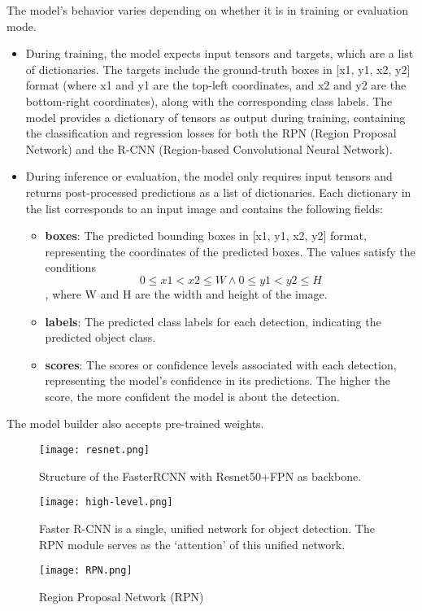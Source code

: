 The model's behavior varies depending on whether it is in training or evaluation mode.
\begin{itemize}
    \item During training, the model expects input tensors and targets, which are a list of dictionaries. The targets include the ground-truth boxes in [x1, y1, x2, y2] format (where x1 and y1 are the top-left coordinates, and x2 and y2 are the bottom-right coordinates), along with the corresponding class labels. The model provides a dictionary of tensors as output during training, containing the classification and regression losses for both the RPN (Region Proposal Network) and the R-CNN (Region-based Convolutional Neural Network).
    \item During inference or evaluation, the model only requires input tensors and returns post-processed predictions as a list of dictionaries. Each dictionary in the list corresponds to an input image and contains the following fields:
    \begin{itemize}
        \item \textbf{boxes}: The predicted bounding boxes in [x1, y1, x2, y2] format, representing the coordinates of the predicted boxes. The values satisfy the conditions \[0 \le x1 < x2 \le W \land 0 \le y1 < y2 \le H\], where W and H are the width and height of the image.
        \item \textbf{labels}: The predicted class labels for each detection, indicating the predicted object class.
        \item \textbf{scores}: The scores or confidence levels associated with each detection, representing the model's confidence in its predictions. The higher the score, the more confident the model is about the detection.

    \end{itemize}
\end{itemize}

The model builder also accepts pre-trained weights.

\begin{figure}[h!]
  \centering
  \texttt{[image: resnet.png]}
  \caption{Structure of the FasterRCNN with Resnet50+FPN as backbone.}
  \label{fig:resnetstruct}
\end{figure}
\begin{figure}[h!]
  \centering
  \texttt{[image: high-level.png]}
  \caption{Faster R-CNN is a single, unified network for object detection. The RPN module serves as the ‘attention’ of this unified network.}
  \label{fig:generalrcnn}
\end{figure}
\begin{figure}[h!]
  \centering
  \texttt{[image: RPN.png]}
  \caption{Region Proposal Network (RPN)}
  \label{fig:rpn}
\end{figure}

